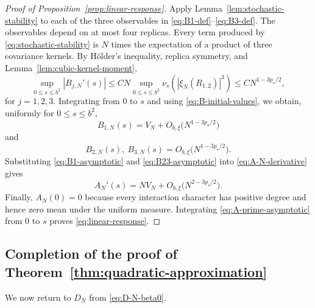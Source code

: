 \documentclass[letterpaper,11pt,reqno]{amsart}
\renewcommand{\leq}{\leqslant}
\begin{document}
\begin{proof}[Proof of Proposition~\ref{prop:linear-response}]
Apply Lemma~\ref{lem:stochastic-stability} to each of the three
observables in \eqref{eq:B1-def}--\eqref{eq:B3-def}. The observables
depend on at most four replicas. Every term produced by
\eqref{eq:stochastic-stability} is $N$ times the expectation of a
product of three covariance kernels. By H\"older's inequality,
replica symmetry, and Lemma~\ref{lem:cubic-kernel-moment},
\begin{equation}
\sup_{0\leq s\leq b^2}
|B_{j,N}'(s)|
\leq
C N\sup_{0\leq s\leq b^2}
\nu_s\left(|\xi_N(R_{1,2})|^3\right)
\leq
C N^{1-3p_\star/2},
\label{eq:B-derivative-bound}
\end{equation}
for $j=1,2,3$. Integrating from $0$ to $s$ and using
\eqref{eq:B-initial-values}, we obtain, uniformly for
$0\leq s\leq b^2$,
\begin{equation}
B_{1,N}(s)
=
V_N+O_{b,\xi}\bigl(N^{1-3p_\star/2}\bigr)
\label{eq:B1-asymptotic}
\end{equation}
and
\begin{equation}
B_{2,N}(s),\ B_{3,N}(s)
=
O_{b,\xi}\bigl(N^{1-3p_\star/2}\bigr).
\label{eq:B23-asymptotic}
\end{equation}
Substituting \eqref{eq:B1-asymptotic} and
\eqref{eq:B23-asymptotic} into \eqref{eq:A-N-derivative} gives
\begin{equation}
A_N'(s)
=
NV_N+O_{b,\xi}\bigl(N^{2-3p_\star/2}\bigr).
\label{eq:A-prime-asymptotic}
\end{equation}
Finally, $A_N(0)=0$ because every interaction character has positive
degree and hence zero mean under the uniform measure. Integrating
\eqref{eq:A-prime-asymptotic} from $0$ to $s$ proves
\eqref{eq:linear-response}.
\end{proof}

\subsection{Completion of the proof of Theorem~\ref{thm:quadratic-approximation}}
\label{subsec:complete-quadratic}

We now return to $D_N$ from \eqref{eq:D-N-beta0}.
\end{document}
